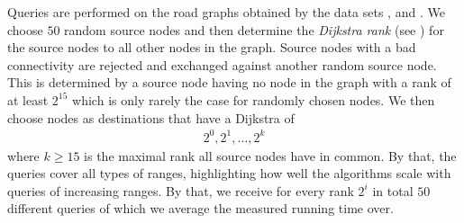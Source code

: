 	Queries are performed on the road graphs obtained by the data sets \freiburgR, \stuttgartR and \switzerlandR.
	We choose $50$ random source nodes and then determine the \textit{Dijkstra rank} (see )
	for the source nodes to all other nodes in the graph. Source nodes with a bad connectivity are rejected and exchanged
	against another random source node. This is determined by a source node having no node in the graph with a rank of at
	least $2^{15}$ which is only rarely the case for randomly chosen nodes.
	We then choose nodes as destinations that have a Dijkstra of
	\begin{align*}
		2^0, 2^1, \ldots, 2^k
	\end{align*}
	where $k \ge 15$ is the maximal rank all source nodes have in common. By that, the queries cover all types of
	ranges, highlighting how well the algorithms scale with queries of increasing ranges.
	By that, we receive for every rank $2^i$ in total $50$ different queries of which we average the
	measured running time over.\\

